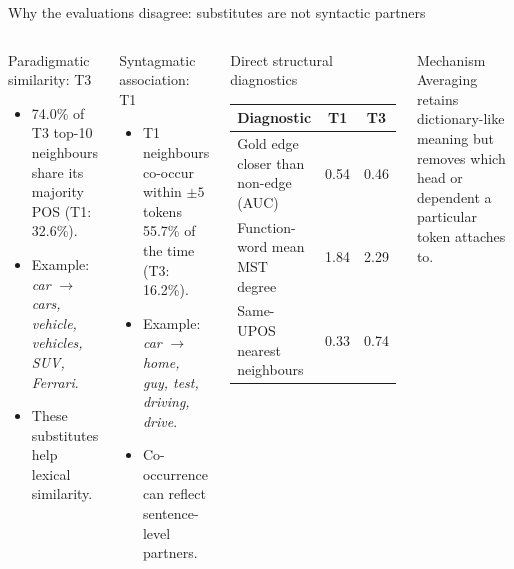 \documentclass[aspectratio=169,9pt]{beamer}
\newcommand{\tightitem}{\setlength{\itemsep}{0.14em}\setlength{\parskip}{0pt}}
\begin{document}
\begin{frame}{Why the evaluations disagree: substitutes are not syntactic partners}
\begin{columns}[T,onlytextwidth]
  \begin{block}{Paradigmatic similarity: T3}
    \begin{itemize}\tightitem
      \item 74.0\% of T3 top-10 neighbours share its majority POS (T1: 32.6\%).
      \item Example: \textit{car} $\rightarrow$ \textit{cars, vehicle, vehicles, SUV, Ferrari}.
      \item These substitutes help lexical similarity.
    \end{itemize}
  \end{block}
  \begin{block}{Syntagmatic association: T1}
    \begin{itemize}\tightitem
      \item T1 neighbours co-occur within $\pm5$ tokens 55.7\% of the time (T3: 16.2\%).
      \item Example: \textit{car} $\rightarrow$ \textit{home, guy, test, driving, drive}.
      \item Co-occurrence can reflect sentence-level partners.
    \end{itemize}
  \end{block}
  \begin{block}{Direct structural diagnostics}
    \small
    \begin{tabular}{lcc}
      \toprule
      \textbf{Diagnostic} & \textbf{T1} & \textbf{T3}\\
      \midrule
      Gold edge closer than non-edge (AUC) & 0.54 & 0.46\\
      Function-word mean MST degree & 1.84 & 2.29\\
      Same-UPOS nearest neighbours & 0.33 & 0.74\\
      \bottomrule
    \end{tabular}
  \end{block}
  \begin{alertblock}{Mechanism}
    Averaging retains dictionary-like meaning but removes which head or dependent a particular token attaches to.
  \end{alertblock}
\end{columns}
\end{frame}
\end{document}
